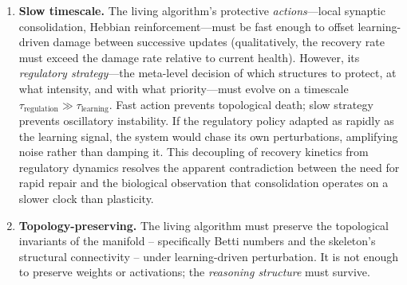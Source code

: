 \documentclass{article}
\begin{document}
\begin{enumerate}
Recent work by \citet{Bosca2026sheaf} offers a mathematical framework (arXiv preprint, March 2026; pending peer review) for such local-to-global coherence in neural architectures. By constructing a cellular sheaf from any feedforward ReLU network and showing that the forward pass output is the unique harmonic extension of boundary data, Bosca and Ghrist demonstrate that layer-local discrepancy minimization via the sheaf Laplacian---operating without any backward pass---can maintain global topological constraints. Under the assumptions of their construction, bidirectional information flow through a sheaf heat equation converges exponentially to the correct output, enabling training through purely local operations while preserving the global structure of the computation. This is precisely the class of mathematical structure that the living algorithm requires: a local operator whose collective action preserves global invariants.\footnote{We note that \citet{Bosca2026sheaf} is a recent preprint (March 2026), pending peer review; its sheaf-based training, while theoretically principled, is not yet competitive with SGD at scale. We cite it as a mathematical construct illustrating the architectural pattern---local operations preserving global constraints---not as an off-the-shelf solution.}
    \item \textbf{Slow timescale.} The living algorithm's protective \emph{actions}---local synaptic consolidation, Hebbian reinforcement---must be fast enough to offset learning-driven damage between successive updates (qualitatively, the recovery rate must exceed the damage rate relative to current health). However, its \emph{regulatory strategy}---the meta-level decision of which structures to protect, at what intensity, and with what priority---must evolve on a timescale $\tau_{\text{regulation}} \gg \tau_{\text{learning}}$. Fast action prevents topological death; slow strategy prevents oscillatory instability. If the regulatory policy adapted as rapidly as the learning signal, the system would chase its own perturbations, amplifying noise rather than damping it. This decoupling of recovery kinetics from regulatory dynamics resolves the apparent contradiction between the need for rapid repair and the biological observation that consolidation operates on a slower clock than plasticity.
    \item \textbf{Topology-preserving.} The living algorithm must preserve the topological invariants of the manifold -- specifically Betti numbers and the skeleton's structural connectivity -- under learning-driven perturbation. It is not enough to preserve weights or activations; the \emph{reasoning structure} must survive.

\end{enumerate}
\end{document}
